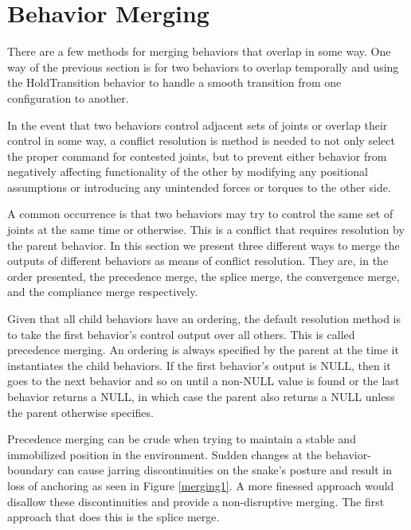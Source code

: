 \section{Behavior Merging}

\label{sec:merge}

There are a few methods for merging behaviors that overlap in some way.  One way of the previous section is for two behaviors to overlap temporally and using the HoldTransition behavior to handle a smooth transition from one configuration to another.

In the event that two behaviors control adjacent sets of joints or overlap their control in some way, a conflict resolution is method is needed to not only select the proper command for contested joints, but to prevent either behavior from negatively affecting functionality of the other by modifying any positional assumptions or introducing any unintended forces or torques to the other side.

A common occurrence is that two behaviors may try to control the same set of joints at the same time or otherwise.  This is a conflict that requires resolution by the parent behavior.  In this section we present three different ways to merge the outputs of different behaviors as means of conflict resolution.  They are, in the order presented, the precedence merge, the splice merge, the convergence merge, and the compliance merge respectively.

Given that all child behaviors have an ordering, the default resolution method is to take the first behavior’s control output over all others.  This is called precedence merging.  An ordering is always specified by the parent at the time it instantiates the child behaviors.  If the first behavior’s output is NULL, then it goes to the next behavior and so on until a non-NULL value is found or the last behavior returns a NULL, in which case the parent also returns a NULL unless the parent otherwise specifies.

Precedence merging can be crude when trying to maintain a stable and immobilized position in the environment.  Sudden changes at the behavior-boundary can cause jarring discontinuities on the snake’s posture and result in loss of anchoring as seen in Figure \ref{merging1}.  A more finessed approach would disallow these discontinuities and provide a non-disruptive merging.  The first approach that does this is the splice merge.

